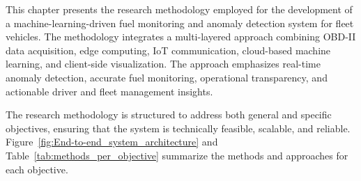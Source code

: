This chapter presents the research methodology employed for the development of a machine-learning-driven fuel monitoring and anomaly detection system for fleet vehicles. The methodology integrates a multi-layered approach combining OBD-II data acquisition, edge computing, IoT communication, cloud-based machine learning, and client-side visualization. The approach emphasizes real-time anomaly detection, accurate fuel monitoring, operational transparency, and actionable driver and fleet management insights.

The research methodology is structured to address both general and specific objectives, ensuring that the system is technically feasible, scalable, and reliable. Figure~\ref{fig:End-to-end_system_architecture} and Table~\ref{tab:methods_per_objective} summarize the methods and approaches for each objective.

